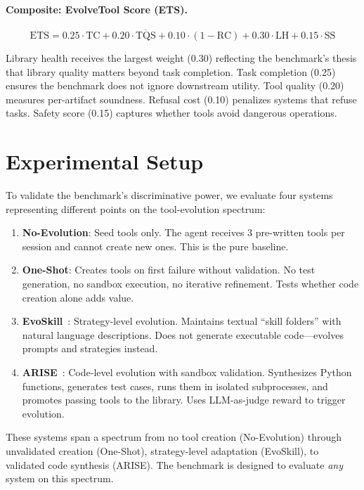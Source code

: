 \documentclass[10pt,twocolumn]{article}
\begin{document}
\paragraph{Composite: EvolveTool Score (ETS).}
\begin{equation}
\text{ETS} = 0.25 \!\cdot\! \text{TC} + 0.20 \!\cdot\! \overline{\text{TQS}} + 0.10 \!\cdot\! (1{-}\text{RC}) + 0.30 \!\cdot\! \text{LH} + 0.15 \!\cdot\! \text{SS}
\end{equation}

Library health receives the largest weight (0.30) reflecting the benchmark's thesis that library quality matters beyond task completion. Task completion (0.25) ensures the benchmark does not ignore downstream utility. Tool quality (0.20) measures per-artifact soundness. Refusal cost (0.10) penalizes systems that refuse tasks. Safety score (0.15) captures whether tools avoid dangerous operations.

\section{Experimental Setup}

To validate the benchmark's discriminative power, we evaluate four systems representing different points on the tool-evolution spectrum:

\begin{enumerate}
\item \textbf{No-Evolution}: Seed tools only. The agent receives 3 pre-written tools per session and cannot create new ones. This is the pure baseline.
\item \textbf{One-Shot}: Creates tools on first failure without validation. No test generation, no sandbox execution, no iterative refinement. Tests whether code creation alone adds value.
\item \textbf{EvoSkill}~\cite{alzubi2026evoskill}: Strategy-level evolution. Maintains textual ``skill folders'' with natural language descriptions. Does not generate executable code---evolves prompts and strategies instead.
\item \textbf{ARISE}~\cite{kaliyev2026arise}: Code-level evolution with sandbox validation. Synthesizes Python functions, generates test cases, runs them in isolated subprocesses, and promotes passing tools to the library. Uses LLM-as-judge reward to trigger evolution.
\end{enumerate}

These systems span a spectrum from no tool creation (No-Evolution) through unvalidated creation (One-Shot), strategy-level adaptation (EvoSkill), to validated code synthesis (ARISE). The benchmark is designed to evaluate \emph{any} system on this spectrum.
\end{document}
